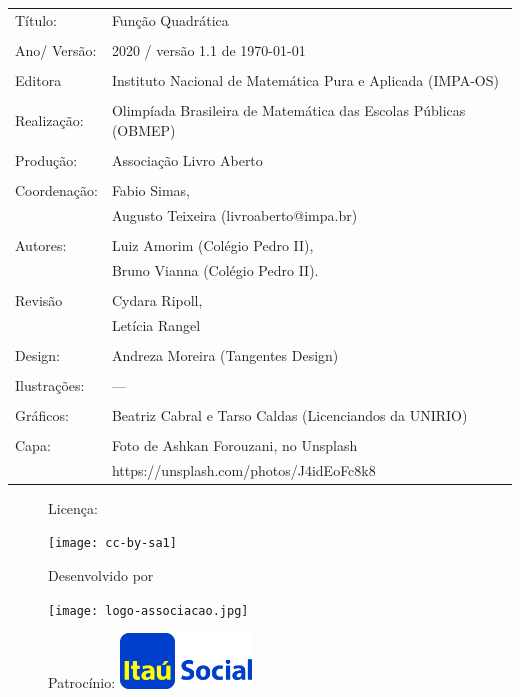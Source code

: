 \begin{tabular}{p{}p{}}
Título: & Função Quadrática\\
\\
Ano/ Versão: & 2020 / versão 1.1 de \today\\
\\
Editora & Instituto Nacional de Matem\'atica Pura e Aplicada (IMPA-OS)\\
\\
Realização:& Olimp\'iada Brasileira de Matem\'atica das Escolas P\'ublicas (OBMEP)\\
\\
Produção:& Associação Livro Aberto\\
\\
Coordenação:& Fabio Simas, \\
			& Augusto Teixeira (livroaberto@impa.br)\\
\\
  Autores: & Luiz Amorim (Colégio Pedro II),\\
           & Bruno Vianna (Colégio Pedro II).\\

\\
Revisão &  Cydara Ripoll,  \\
        &  Letícia Rangel \\
\\
Design: & Andreza Moreira (Tangentes Design) \\
\\
  Ilustrações: & --- \\ 
\\
Gráficos: & Beatriz Cabral e Tarso Caldas (Licenciandos da UNIRIO)\\
\\
  Capa: & Foto de Ashkan Forouzani, no Unsplash\\
  		& https://unsplash.com/photos/J4idEoFc8k8 \\

\end{tabular}
\vspace{.5cm}


\begin{figure}[b]
\begin{minipage}[l]{5cm}
\centering

{\large Licença:}

  \texttt{[image: cc-by-sa1]}
\end{minipage}\hfill
\begin{minipage}[c]{5cm}
\centering
{\large Desenvolvido por}

\texttt{[image: logo-associacao.jpg]}
\end{minipage}
\begin{minipage}[r]{5cm}
\centering

{\large Patrocínio:}
  \vspace{1em}
  \includegraphics[width=3.5cm]{itau}
\end{minipage}
\end{figure}

